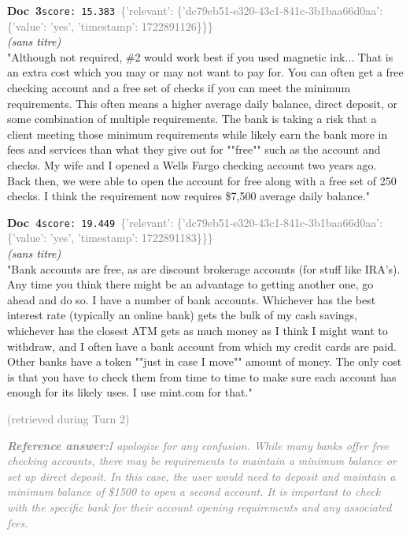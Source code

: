 \documentclass[a4paper,11pt]{article}
\begin{document}
\begin{docenv}
{\footnotesize\textcolor{doccolor}{\textbf{Doc~3}}}\hfill{\tiny\texttt{score:~15.383}}\ {\tiny\textcolor{gray}{\{'relevant': \{'dc79eb51-e320-43c1-841c-3b1baa66d0aa': \{'value': 'yes', 'timestamp': 1722891126\}\}\}}}\\[3pt]
{\small\textit{(sans titre)}}\\[2pt]
\vspace{2pt}
{\footnotesize 
"Although not required, \#2 would work best if you used magnetic ink... That is an extra cost which you may or may not want to pay for. You can often get a free checking account and a free set of checks if you can meet the minimum requirements. This often means a higher average daily balance, direct deposit, or some combination of multiple requirements. The bank is taking a risk that a client meeting those minimum requirements while likely earn the bank more in fees and services than what they give out for ""free"" such as the account and checks. My wife and I opened a Wells Fargo checking account two years ago. Back then, we were able to open the account for free along with a free set of 250 checks. I think the requirement now requires \$7,500 average daily balance."}
\end{docenv}
\begin{docenv}
{\footnotesize\textcolor{doccolor}{\textbf{Doc~4}}}\hfill{\tiny\texttt{score:~19.449}}\ {\tiny\textcolor{gray}{\{'relevant': \{'dc79eb51-e320-43c1-841c-3b1baa66d0aa': \{'value': 'yes', 'timestamp': 1722891183\}\}\}}}\\[3pt]
{\small\textit{(sans titre)}}\\[2pt]
\vspace{2pt}
{\footnotesize 
"Bank accounts are free, as are discount brokerage accounts (for stuff like IRA's).  Any time you think there might be an advantage to getting another one, go ahead and do so. I have a number of bank accounts.  Whichever has the best interest rate (typically an online bank) gets the bulk of my cash savings, whichever has the closest ATM gets as much money as I think I might want to withdraw, and I often have a bank account from which my credit cards are paid. Other banks have a token ""just in case I move"" amount of money. The only cost is that you have to check them from time to time to make sure each account has enough for its likely uses.  I use mint.com for that."}
\end{docenv}
\hfill{\tiny\textcolor{gray}{(retrieved during Turn 2)}}
\begin{refanswerenv}
{\footnotesize\textit{\textcolor{gray}{\textbf{Reference answer:}\enspace I apologize for any confusion. While many banks offer free checking accounts, there may be requirements to maintain a minimum balance or set up direct deposit. In this case, the user would need to deposit and maintain a minimum balance of \$1500 to open a second account. It is important to check with the specific bank for their account opening requirements and any associated fees.}}}
\end{refanswerenv}
\end{document}
